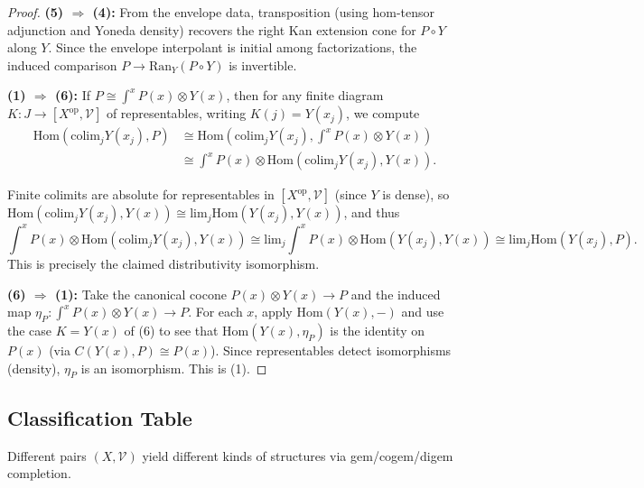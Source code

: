 \documentclass[11pt]{article}
\theoremstyle{plain}
\theoremstyle{definition}
\theoremstyle{remark}
\newcommand{\V}{\mathcal{V}}
\newcommand{\op}{\mathrm{op}}
\newcommand{\colim}{\mathrm{colim}}
\renewcommand{\lim}{\mathrm{lim}}
\newcommand{\Hom}{\mathrm{Hom}}
\newcommand{\Ran}{\mathrm{Ran}}
\begin{document}
\begin{proof}
\textbf{(5) $\Rightarrow$ (4):} From the envelope data, transposition (using hom-tensor adjunction and Yoneda density) recovers the right Kan extension cone for $P \circ Y$ along $Y$. Since the envelope interpolant is initial among factorizations, the induced comparison $P \to \Ran_Y(P \circ Y)$ is invertible.

\textbf{(1) $\Rightarrow$ (6):} If $P \cong \int^x P(x) \otimes Y(x)$, then for any finite diagram $K : J \to [X^{\op}, \V]$ of representables, writing $K(j) = Y(x_j)$, we compute
\begin{align}
\Hom(\colim_j Y(x_j), P) &\cong \Hom(\colim_j Y(x_j), \int^x P(x) \otimes Y(x)) \\
&\cong \int^x P(x) \otimes \Hom(\colim_j Y(x_j), Y(x)).
\end{align}

Finite colimits are absolute for representables in $[X^{\op}, \V]$ (since $Y$ is dense), so $\Hom(\colim_j Y(x_j), Y(x)) \cong \lim_j \Hom(Y(x_j), Y(x))$, and thus
$$
\int^x P(x) \otimes \Hom(\colim_j Y(x_j), Y(x)) \cong \lim_j \int^x P(x) \otimes \Hom(Y(x_j), Y(x)) \cong \lim_j \Hom(Y(x_j), P).
$$
This is precisely the claimed distributivity isomorphism.

\textbf{(6) $\Rightarrow$ (1):} Take the canonical cocone $P(x) \otimes Y(x) \to P$ and the induced map $\eta_P : \int^x P(x) \otimes Y(x) \to P$. For each $x$, apply $\Hom(Y(x), -)$ and use the case $K = Y(x)$ of (6) to see that $\Hom(Y(x), \eta_P)$ is the identity on $P(x)$ (via $C(Y(x), P) \cong P(x)$). Since representables detect isomorphisms (density), $\eta_P$ is an isomorphism. This is (1).
\end{proof}

\subsection{Classification Table}

Different pairs $(X, \V)$ yield different kinds of structures via gem/cogem/digem completion.
\end{document}
